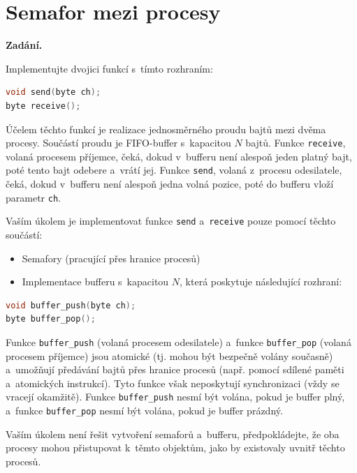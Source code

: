 \section{Semafor mezi procesy}

\noindent\textbf{Zadání.}\par
Implementujte dvojici funkcí s~tímto rozhraním:

\begin{lstlisting}[language=C]
void send(byte ch);
byte receive();
\end{lstlisting}

Účelem těchto funkcí je realizace jednosměrného proudu bajtů mezi dvěma procesy. Součástí
proudu je FIFO-buffer s~kapacitou $N$ bajtů. Funkce \texttt{receive}, volaná procesem
příjemce, čeká, dokud v~bufferu není alespoň jeden platný bajt, poté tento bajt odebere
a~vrátí jej. Funkce \texttt{send}, volaná z~procesu odesilatele, čeká, dokud v~bufferu
není alespoň jedna volná pozice, poté do bufferu vloží parametr \texttt{ch}.

Vaším úkolem je implementovat funkce \texttt{send} a~\texttt{receive} pouze pomocí těchto součástí:
\begin{itemize}
\item Semafory (pracující přes hranice procesů)
\item Implementace bufferu s~kapacitou $N$, která poskytuje následující rozhraní:
\end{itemize}

\begin{lstlisting}[language=C]
void buffer_push(byte ch);
byte buffer_pop();
\end{lstlisting}

Funkce \texttt{buffer\_push} (volaná procesem odesilatele) a~funkce \texttt{buffer\_pop}
(volaná procesem příjemce) jsou atomické (tj. mohou být bezpečně volány současně)
a~umožňují předávání bajtů přes hranice procesů (např. pomocí sdílené paměti a~atomických
instrukcí). Tyto funkce však neposkytují synchronizaci (vždy se vracejí okamžitě). Funkce
\texttt{buffer\_push} nesmí být volána, pokud je buffer plný, a~funkce \texttt{buffer\_pop}
nesmí být volána, pokud je buffer prázdný.

Vaším úkolem není řešit vytvoření semaforů a~bufferu, předpokládejte, že oba procesy mohou
přistupovat k~těmto objektům, jako by existovaly uvnitř těchto procesů.

